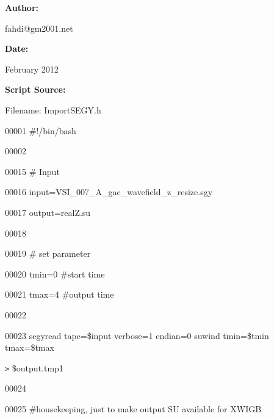 \documentclass{article}
\begin{document}
\vspace{4pt}
\textbf{Author:}

\vspace{4pt}
\leftskip=18pt
fahdi@gm2001.net 

\vspace{4pt}
\leftskip=0pt
\textbf{Date:}

\vspace{4pt}
\leftskip=18pt
February 2012 \pagebreak{}

\vspace{16pt}
\leftskip=0pt
\textbf{Script Source:}

\vspace{4pt}
Filename: ImportSEGY.h

\vspace{16pt}
00001 \#!/bin/bash\label{l00002}

\vspace{4pt}
00002 \label{l00015}

\vspace{4pt}
00015 \# Input\label{l00016}

\vspace{4pt}
00016 input=VSI\_007\_A\_gac\_wavefield\_z\_resize.sgy\label{l00017}

\vspace{4pt}
00017 output=realZ.su\label{l00018}

\vspace{4pt}
00018 \label{l00019}

\vspace{4pt}
00019 \# set parameter\label{l00020}

\vspace{4pt}
00020 tmin=0 \#start time\label{l00021}

\vspace{4pt}
00021 tmax=4 \#output time\label{l00022}

\vspace{4pt}
00022 \label{l00023}

\vspace{4pt}
00023 segyread tape=\$input verbose=1 endian=0 \textbar{} suwind tmin=\$tmin tmax=\$tmax 

\vspace{4pt}
\texttt{>} \$output.tmp1\label{l00024}

\vspace{4pt}
00024 \label{l00025}

\vspace{4pt}
00025 \#housekeeping, just to make output SU available for XWIGB\label{l00026}
\end{document}
